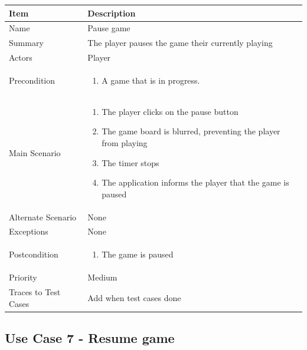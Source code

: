\documentclass[12pt]{article}
\begin{document}
\begin{center}
\setlength{\tabcolsep}{18pt}
\renewcommand{\arraystretch}{1.3}
\begin{tabular}{ |p{3.4cm}|p{10cm}| }
    \hline
    \textbf{Item} & \textbf{Description} \\
    \hline
    Name & Pause game \\
    \hline
    Summary & The player pauses the game their currently playing \\
    \hline
    Actors & Player \\
    \hline
    Precondition & 
    \vspace*{-0.1in}
    \begin{enumerate}[leftmargin=0.2in]
        \item A game that is in progress.
    \end{enumerate}  \\
    \hline
    Main Scenario &     
    \vspace*{-0.1in}
    \begin{enumerate}[leftmargin=0.2in]
        \item The player clicks on the pause button
        \item The game board is blurred, preventing the player from playing
        \item The timer stops  
        \item The application informs the player that the game is paused
    \end{enumerate}  \\
    \hline
    Alternate Scenario & None \\
    \hline
    Exceptions & None \\
    \hline
    Postcondition & \vspace*{-0.1in}
    \begin{enumerate}[leftmargin=0.2in]
        \item The game is paused
    \end{enumerate}  \\
    \hline
    Priority & Medium  \\
    \hline
    \small{Traces to Test Cases} & Add when test cases done  \\
    \hline
\end{tabular}
\end{center}

\newpage


\subsection{Use Case 7 - Resume game}
\end{document}
